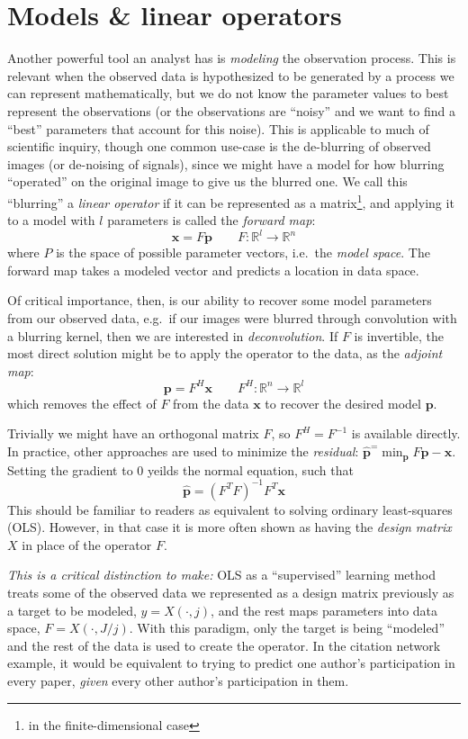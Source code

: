 \documentclass[%
	12pt,
		oneside,
		letterpaper
]{book}
\begin{document}
\section{Models \& linear operators}\label{models-linear-operators}

Another powerful tool an analyst has is \emph{modeling} the observation
process. This is relevant when the observed data is hypothesized to be
generated by a process we can represent mathematically, but we do not
know the parameter values to best represent the observations (or the
observations are ``noisy'' and we want to find a ``best'' parameters
that account for this noise). This is applicable to much of scientific
inquiry, though one common use-case is the de-blurring of observed
images (or de-noising of signals), since we might have a model for how
blurring ``operated'' on the original image to give us the blurred one.
We call this ``blurring'' a \emph{linear operator} if it can be
represented as a matrix\footnote{in the finite-dimensional case}, and
applying it to a model with \(l\) parameters is called the \emph{forward
map}:
\[\mathbf{x} = F\mathbf{p}\qquad F:\mathbb{R}^{l}\rightarrow \mathbb{R}^n\]
where \(P\) is the space of possible parameter vectors, i.e.~the
\emph{model space}. The forward map takes a modeled vector and predicts
a location in data space.

Of critical importance, then, is our ability to recover some model
parameters from our observed data, e.g.~if our images were blurred
through convolution with a blurring kernel, then we are interested in
\emph{deconvolution}. If \(F\) is invertible, the most direct solution
might be to apply the operator to the data, as the \emph{adjoint map}:
\[ \mathbf{p} = F^H\mathbf{x}\qquad F^H:\mathbb{R}^{n}\rightarrow \mathbb{R}^l\]
which removes the effect of \(F\) from the data \(\mathbf{x}\) to
recover the desired model \(\mathbf{p}\).

Trivially we might have an orthogonal matrix \(F\), so \(F^H=F^{-1}\) is
available directly. In practice, other approaches are used to minimize
the \emph{residual}:
\(\hat{\mathbf{p}}^=\min_{\mathbf{p}} F\mathbf{p}-\mathbf{x}\). Setting
the gradient to 0 yeilds the normal equation, such that
\[ \hat{\mathbf{p}}=(F^TF)^{-1}F^T\mathbf{x}\] This should be familiar
to readers as equivalent to solving ordinary least-squares (OLS).
However, in that case it is more often shown as having the \emph{design
matrix} \(X\) in place of the operator \(F\).

\emph{This is a critical distinction to make:} OLS as a ``supervised''
learning method treats some of the observed data we represented as a
design matrix previously as a target to be modeled, \(y=X(\cdot,j)\),
and the rest maps parameters into data space, \(F=X(\cdot,J/j)\). With
this paradigm, only the target is being ``modeled'' and the rest of the
data is used to create the operator. In the citation network example, it
would be equivalent to trying to predict one author's participation in
every paper, \emph{given} every other author's participation in them.
\end{document}
